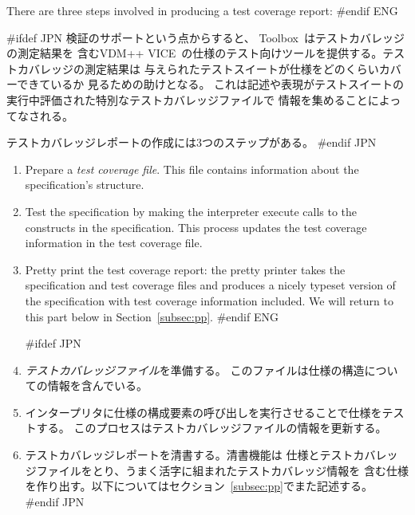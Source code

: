 \documentclass[\pformat,12pt]{article}
\newcommand{\vdmslpp}{VDM-SL}
\newcommand{\Toolbox}{Toolbox}
\newcommand{\vdmslpp}{VDM++}
\newcommand{\Toolbox}{Toolbox}
\renewcommand{\vdmslpp}{VDM++ VICE}
\begin{document}
There are three steps involved in producing a test coverage report:
#endif ENG

#ifdef JPN
検証のサポートという点からすると、 \Toolbox\ はテストカバレッジの測定結果を
含む\vdmslpp\ の仕様のテスト向けツールを提供する。テストカバレッジの測定結果は
与えられたテストスイートが仕様をどのくらいカバーできているか
見るための助けとなる。
これは記述や表現がテストスイートの実行中評価された特別なテストカバレッジファイルで
情報を集めることによってなされる。

テストカバレッジレポートの作成には3つのステップがある。
#endif JPN

\begin{enumerate}
#ifdef ENG
\item
Prepare a {\em test coverage file}. This file contains
  information about the specification's structure. 
\item Test the specification by making the interpreter execute calls
to the constructs in the specification. This process updates the test
coverage information in the test coverage file.
\item Pretty print the test coverage report: the pretty printer takes
  the specification and test coverage files and produces a nicely typeset
  version of the specification with test coverage information
  included. We will return to this part below in Section~\ref{subsec:pp}.
#endif ENG

#ifdef JPN
\item
{\em テストカバレッジファイル}を準備する。
このファイルは仕様の構造についての情報を含んでいる。

\item
インタープリタに仕様の構成要素の呼び出しを実行させることで仕様をテストする。
このプロセスはテストカバレッジファイルの情報を更新する。

\item
テストカバレッジレポートを清書する。清書機能は
仕様とテストカバレッジファイルをとり、うまく活字に組まれたテストカバレッジ情報を
含む仕様を作り出す。以下についてはセクション~\ref{subsec:pp}でまた記述する。
#endif JPN
\end{enumerate}
\end{document}

